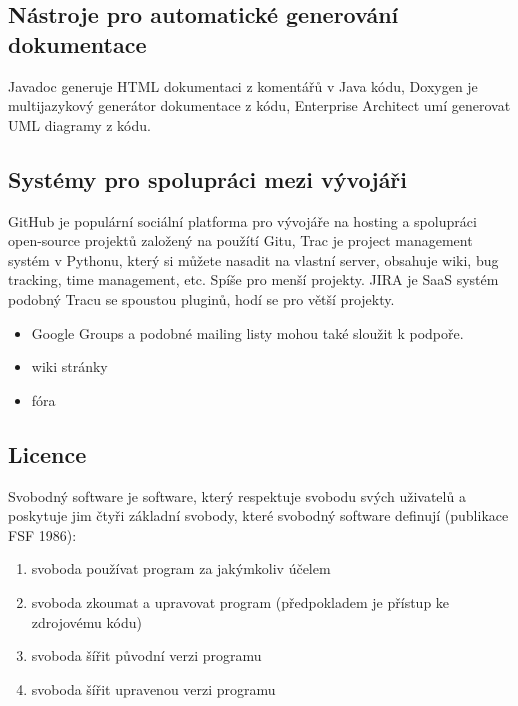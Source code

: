 \subsection{Nástroje pro automatické generování dokumentace}
Javadoc generuje HTML dokumentaci z komentářů v Java kódu, Doxygen je multijazykový generátor dokumentace z kódu, Enterprise Architect umí generovat UML diagramy z kódu.

\subsection{Systémy pro spolupráci mezi vývojáři}
GitHub je populární sociální platforma pro vývojáře na hosting a spolupráci open-source projektů založený na použítí Gitu, Trac je project management systém v Pythonu, který si můžete nasadit na vlastní server, obsahuje wiki, bug tracking, time management, etc. Spíše pro menší projekty. JIRA je SaaS systém podobný Tracu se spoustou pluginů, hodí se pro větší projekty.


\begin{itemize}[itemsep=0px]
\item Google Groups a podobné mailing listy mohou také sloužit k podpoře.
\item wiki stránky
\item fóra
\end{itemize}

\subsection{Licence}
Svobodný software je software, který respektuje svobodu svých uživatelů a poskytuje jim čtyři základní svobody, které svobodný software definují (publikace FSF 1986):

\begin{enumerate}[itemsep=0px]
\item svoboda používat program za jakýmkoliv účelem
\item svoboda zkoumat a upravovat program (předpokladem je přístup
ke zdrojovému kódu)
\item svoboda šířit původní verzi programu
\item svoboda šířit upravenou verzi programu
\end{enumerate}

